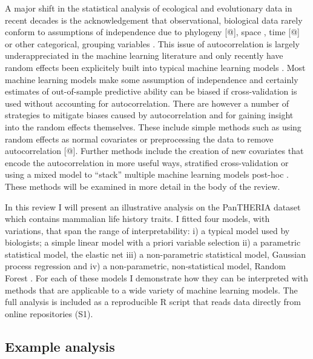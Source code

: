 \documentclass[10pt,]{article}
\begin{document}
A major shift in the statistical analysis of ecological and evolutionary data in recent decades is the acknowledgement that observational, biological data rarely conform to assumptions of independence due to phylogeny {[}@{]}, space \citep{redding2017evaluating, diggle1998model}, time {[}@{]} or other categorical, grouping variables \citep{harrison2018brief, bolker2009generalized}. This issue of autocorrelation is largely underappreciated in the machine learning literature and only recently have random effects been explicitely built into typical machine learning models \citep{eo2014tree, hajjem2014mixed, hajjem2017generalized, miller2017gradient}. Most machine learning models make some assumption of independence and certainly estimates of out-of-sample predictive ability can be biased if cross-validation is used without accounting for autocorrelation. There are however a number of strategies to mitigate biases caused by autocorrelation and for gaining insight into the random effects themselves. These include simple methods such as using random effects as normal covariates or preprocessing the data to remove autocorrelation {[}@{]}. Further methods include the creation of new covariates that encode the autocorrelation in more useful ways, stratified cross-validation \citep{le2014spatial} or using a mixed model to ``stack'' multiple machine learning models post-hoc \citep{bhatt2017improved}. These methods will be examined in more detail in the body of the review.

In this review I will present an illustrative analysis on the PanTHERIA dataset \citep{jones2009pantheria} which contains mammalian life history traits. I fitted four models, with variations, that span the range of interpretability: i) a typical model used by biologists; a simple linear model with a priori variable selection ii) a parametric statistical model, the elastic net \citep{elasticnet} iii) a non-parametric statistical model, Gaussian process regression \citep{rasmussen2004gaussian} and iv) a non-parametric, non-statistical model, Random Forest \citep{breiman2001random}. For each of these models I demonstrate how they can be interpreted with methods that are applicable to a wide variety of machine learning models. The full analysis is included as a reproducible R \citep{R} script that reads data directly from online repositories (S1).

\subsection{Example analysis}\label{example-analysis}
\end{document}
